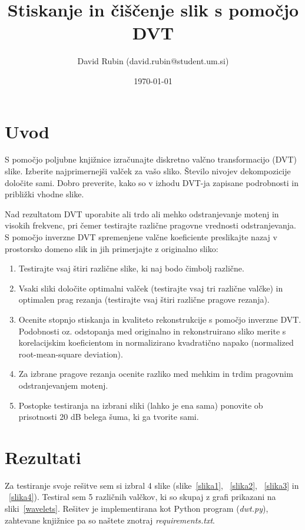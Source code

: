 \documentclass[a4paper,11pt]{article}
\title{Stiskanje in čiščenje slik s pomočjo DVT}
\author{David Rubin (david.rubin@student.um.si)}
\date{\today}
\begin{document}
\maketitle

\section{Uvod}

S pomočjo poljubne knjižnice izračunajte diskretno valčno transformacijo (DVT) slike. Izberite najprimernejši valček za vašo sliko. Število nivojev dekompozicije določite sami. Dobro preverite, kako so v izhodu DVT-ja zapisane podrobnosti in približki vhodne slike. 

Nad rezultatom DVT uporabite ali trdo ali mehko odstranjevanje motenj in visokih frekvenc, pri čemer testirajte različne pragovne vrednosti odstranjevanja. S pomočjo inverzne DVT spremenjene valčne koeficiente preslikajte nazaj v prostorsko domeno slik in jih primerjajte z originalno  sliko:
\begin{enumerate}
\item Testirajte vsaj štiri različne slike, ki naj bodo čimbolj različne. 
\item Vsaki sliki določite optimalni valček (testirajte vsaj tri različne valčke) in optimalen prag rezanja (testirajte vsaj štiri različne pragove rezanja). 
\item Ocenite stopnjo stiskanja in kvaliteto rekonstrukcije s pomočjo inverzne  DVT. Podobnosti oz. odstopanja med originalno in rekonstruirano sliko merite s korelacijskim koeficientom in normalizirano kvadratično napako (normalized root-mean-square deviation).
\item Za izbrane pragove rezanja ocenite razliko med mehkim in trdim pragovnim odstranjevanjem motenj. 
\item Postopke testiranja na izbrani sliki (lahko je ena sama) ponovite ob prisotnosti 20 dB belega šuma, ki ga tvorite sami.
\end{enumerate}

\section{Rezultati}

Za testiranje svoje rešitve sem si izbral 4 slike (slike~\ref{slika1}, ~\ref{slika2}, ~\ref{slika3} in ~\ref{slika4}). Testiral sem 5 različnih valčkov, ki so skupaj z grafi prikazani na sliki~\ref{wavelets}. Rešitev je implementirana kot Python program (\textit{dwt.py}), zahtevane knjižnice pa so naštete znotraj \textit{requirements.txt}.
\end{document}
